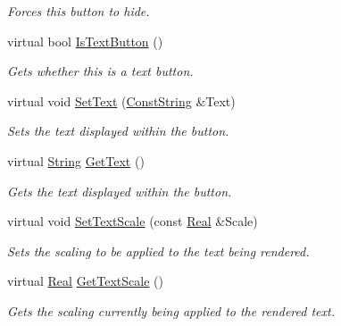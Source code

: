\begin{DoxyCompactItemize}
\begin{DoxyCompactList}\small\item\em Forces this button to hide. \item\end{DoxyCompactList}\item 
virtual bool \hyperlink{classphys_1_1UI_1_1TextButton_ad3d493189347077db92e609e47f837f5}{IsTextButton} ()
\begin{DoxyCompactList}\small\item\em Gets whether this is a text button. \item\end{DoxyCompactList}\item 
virtual void \hyperlink{classphys_1_1UI_1_1TextButton_ae66f149489c4215963dc5b853c838c50}{SetText} (\hyperlink{namespacephys_a5ce5049f8b4bf88d6413c47b504ebb31}{ConstString} \&Text)
\begin{DoxyCompactList}\small\item\em Sets the text displayed within the button. \item\end{DoxyCompactList}\item 
virtual \hyperlink{namespacephys_aa03900411993de7fbfec4789bc1d392e}{String} \hyperlink{classphys_1_1UI_1_1TextButton_a8dc28f2fa610dc9bb72e5886613996bd}{GetText} ()
\begin{DoxyCompactList}\small\item\em Gets the text displayed within the button. \item\end{DoxyCompactList}\item 
virtual void \hyperlink{classphys_1_1UI_1_1TextButton_aa02f940e49a66417fa58cf335bd48f46}{SetTextScale} (const \hyperlink{namespacephys_af7eb897198d265b8e868f45240230d5f}{Real} \&Scale)
\begin{DoxyCompactList}\small\item\em Sets the scaling to be applied to the text being rendered. \item\end{DoxyCompactList}\item 
virtual \hyperlink{namespacephys_af7eb897198d265b8e868f45240230d5f}{Real} \hyperlink{classphys_1_1UI_1_1TextButton_a5cc3750a8565b91d4b4bc91e953f8401}{GetTextScale} ()
\begin{DoxyCompactList}\small\item\em Gets the scaling currently being applied to the rendered text. \item\end{DoxyCompactList}\item 

\end{DoxyCompactItemize}
